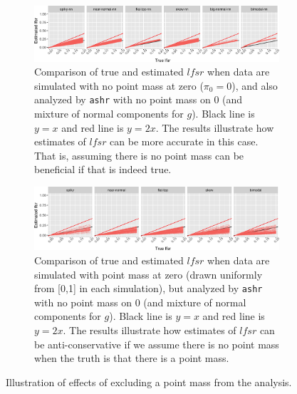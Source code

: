 \documentclass[11pt]{article}
\def\lfsr{\textit{lfsr}}
\def\ashr{{\tt ashr}\xspace}
\begin{document}
\begin{figure}
\begin{center}
\begin{subfigure}{\textwidth}
\includegraphics[width=\textwidth]{../analysis/figure/plot_lfsr.Rmd/plot_lfsr_s_nn-1.png} 
\caption{Comparison of true and estimated $\lfsr$ when data are simulated with no point mass at zero ($\pi_0=0$), and also analyzed by \ashr with no point mass on 0 (and mixture of normal components for $g$). Black line is $y=x$ and red line is $y=2x$. The results illustrate how estimates of $\lfsr$ can be more accurate in this case. That is, assuming there is no point mass can be beneficial if that is indeed true.}  \label{fig:lfsr-nn}
\end{subfigure}
\begin{subfigure}{\textwidth}
\includegraphics[width=\textwidth]{../analysis/figure/plot_lfsr.Rmd/plot_lfsr_s-1.png} 
\caption{Comparison of true and estimated $\lfsr$ when data are simulated with point mass at zero (drawn uniformly from [0,1] in each simulation), but analyzed by \ashr with no point mass on 0 (and mixture of normal components for $g$). Black line is $y=x$ and red line is $y=2x$. The results illustrate how estimates of $\lfsr$ can be anti-conservative if we assume there is no point mass when the truth is that there is a point mass.} \label{fig:lfsr-s}
\end{subfigure}
\end{center}
\caption{Illustration of effects of excluding a point mass from the analysis.} \label{fig:lfsr-nopointmass}
\end{figure}
\end{document}

